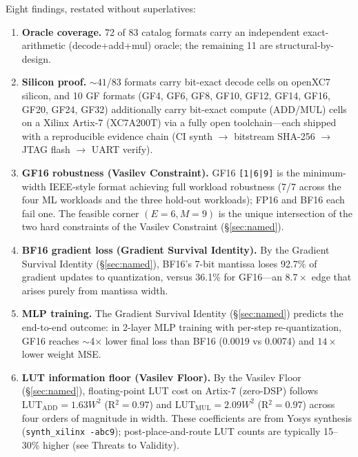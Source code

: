 \documentclass[11pt]{article}
\begin{document}
Eight findings, restated without superlatives:

\begin{enumerate}[label=\textbf{F\arabic*.},leftmargin=*]
\item \textbf{Oracle coverage.} 72 of 83 catalog formats carry an independent
  exact-arithmetic (decode+add+mul) oracle; the remaining 11 are
  structural-by-design.

\item \textbf{Silicon proof.} ${\sim}41$/83 formats carry bit-exact decode cells
  on openXC7 silicon, and 10 GF formats (GF4, GF6, GF8, GF10, GF12, GF14, GF16,
  GF20, GF24, GF32) additionally carry bit-exact compute (ADD/MUL) cells on a
  Xilinx Artix-7 (XC7A200T) via a fully open toolchain---each shipped with a
  reproducible evidence chain (CI synth $\to$ bitstream SHA-256 $\to$ JTAG flash
  $\to$ UART verify).

\item \textbf{GF16 robustness (Vasilev Constraint).} GF16 \texttt{[1|6|9]} is
  the minimum-width IEEE-style format achieving full workload robustness
  (7/7 across the four ML workloads and the three hold-out workloads); FP16
  and BF16 each fail one. The feasible corner $(E{=}6, M{=}9)$ is the
  unique intersection of the two hard constraints of the Vasilev Constraint
  (\S\ref{sec:named}).

\item \textbf{BF16 gradient loss (Gradient Survival Identity).} By the
  Gradient Survival Identity (\S\ref{sec:named}), BF16's 7-bit mantissa
  loses 92.7\% of gradient updates to quantization, versus 36.1\% for
  GF16---an $8.7\times$ edge that arises purely from mantissa width.

\item \textbf{MLP training.} The Gradient Survival Identity
  (\S\ref{sec:named}) predicts the end-to-end outcome: in 2-layer MLP
  training with per-step re-quantization, GF16 reaches $\sim$4$\times$
  lower final loss than BF16 (0.0019 vs 0.0074) and $14\times$ lower
  weight MSE.

\item \textbf{LUT information floor (Vasilev Floor).} By the Vasilev Floor
  (\S\ref{sec:named}), floating-point LUT cost on Artix-7 (zero-DSP)
  follows $\text{LUT}_{\text{ADD}} = 1.63W^{2}$ (R$^{2}{=}0.97$) and
  $\text{LUT}_{\text{MUL}} = 2.09W^{2}$ (R$^{2}{=}0.97$) across four
  orders of magnitude in width. These coefficients are from Yosys
  synthesis (\texttt{synth\_xilinx -abc9}); post-place-and-route LUT
  counts are typically 15--30\% higher (see Threats to Validity).


\end{enumerate}
\end{document}
